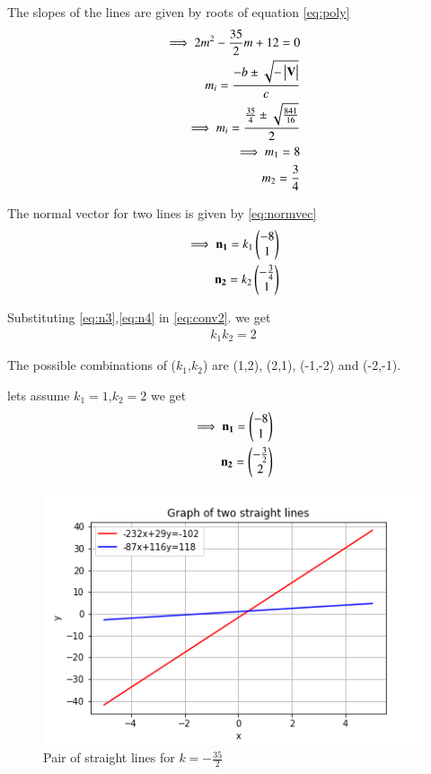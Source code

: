 \documentclass[journal,12pt,twocolumn]{IEEEtran}
\begin{document}
The slopes of the lines are given by roots of equation \eqref{eq:poly}
\begin{align}
    \implies 2m^2-\frac{35}{2}m+12=0\\
    m_i=\frac{-b\pm{\sqrt{-\ensuremath{\begin{vmatrix}\mathbf{V}\end{vmatrix}}}}}{c}\\
    \implies m_i=\frac{\frac{35}{4}\pm{\sqrt{\frac{841}{16}}}}{2}\\
    \implies m_1=8\\
     m_2=\frac{3}{4}
\end{align}

The normal vector for two lines is given by \eqref{eq:normvec}
\begin{align}
    \implies\mathbf{n_1}=k_1\begin{pmatrix}-8\\1\end{pmatrix}\label{eq:n3}\\
    \mathbf{n_2}=k_2\begin{pmatrix}-\frac{3}{4}\\1\end{pmatrix}\label{eq:n4}
\end{align}

Substituting \eqref{eq:n3},\eqref{eq:n4} in \eqref{eq:conv2}. we get
\begin{align}
    k_1k_2=2
\end{align}

The possible combinations of ($k_1$,$k_2$) are (1,2), (2,1), (-1,-2) and (-2,-1).

lets assume $k_1=1$,$k_2=2$ we get
\begin{align}
    \implies\mathbf{n_1}=\begin{pmatrix}-8\\1\end{pmatrix}\label{soln3}\\
    \mathbf{n_2}=\begin{pmatrix}-\frac{3}{2}\\2\end{pmatrix}\label{soln4}
\end{align}
\renewcommand{\thefigure}{2}
\begin{figure}[ht!]
    \centering
    \includegraphics[width=\columnwidth]{Figure2}
    \caption{Pair of straight lines for $k=-\frac{35}{2}$}
    \label{fig:figure2}
\end{figure}
\end{document}
